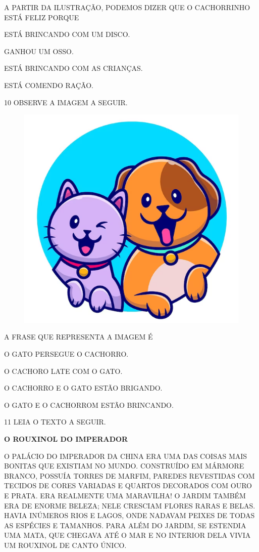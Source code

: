 A PARTIR DA ILUSTRAÇÃO, PODEMOS DIZER QUE O CACHORRINHO ESTÁ FELIZ PORQUE

\begin{escolha}

\item ESTÁ BRINCANDO COM UM DISCO.

\item GANHOU UM OSSO.

\item ESTÁ BRINCANDO COM AS CRIANÇAS.

\item ESTÁ COMENDO RAÇÃO.

\end{escolha}

\num{10} OBSERVE A IMAGEM A SEGUIR.

\begin{figure}[H]
\centering
\includegraphics[width=.5\textwidth]{./media/image227.png}
\end{figure}

A FRASE QUE REPRESENTA A IMAGEM É

\begin{escolha}

\item O GATO PERSEGUE O CACHORRO.
\item O CACHORO LATE COM O GATO.
\item O CACHORRO E O GATO ESTÃO BRIGANDO.
\item O GATO E O CACHORROM ESTÃO BRINCANDO.

\end{escolha}

\num{11} LEIA O TEXTO A SEGUIR.

\begin{myquote}
\textbf{O ROUXINOL DO IMPERADOR}

O PALÁCIO DO IMPERADOR DA CHINA ERA UMA DAS COISAS MAIS
BONITAS QUE EXISTIAM NO MUNDO. CONSTRUÍDO EM MÁRMORE
BRANCO, POSSUÍA TORRES DE MARFIM, PAREDES REVESTIDAS COM
TECIDOS DE CORES VARIADAS E QUARTOS DECORADOS COM OURO E
PRATA. ERA REALMENTE UMA MARAVILHA!
O JARDIM TAMBÉM ERA DE ENORME BELEZA; NELE CRESCIAM
FLORES RARAS E BELAS. HAVIA INÚMEROS RIOS E LAGOS, ONDE
NADAVAM PEIXES DE TODAS AS ESPÉCIES E TAMANHOS.
PARA ALÉM DO JARDIM, SE ESTENDIA UMA MATA, QUE
CHEGAVA ATÉ O MAR E NO INTERIOR DELA VIVIA UM ROUXINOL DE
CANTO ÚNICO.

\end{myquote}

